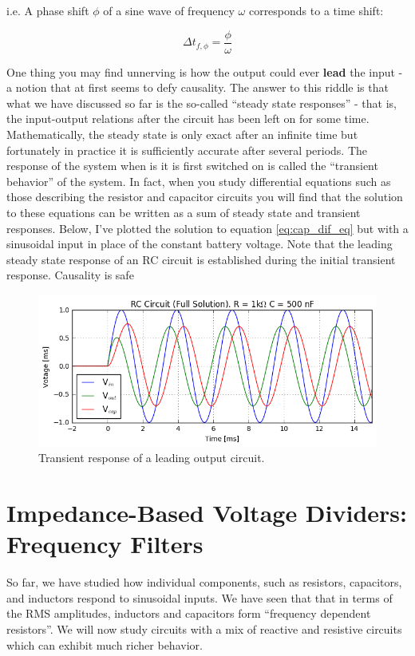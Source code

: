 \documentclass{tufte-book}
\begin{document}
\noindent i.e. A phase shift $\phi$ of a sine wave of frequency $\omega$ corresponds to a time shift:

\begin{equation}\label{eq:phase_time_sine_2}
\Delta t_{f,\phi} = \frac{\phi}{\omega}
\end{equation}

One thing you may find unnerving is how the output could ever \textbf{lead} the input - a notion that at first seems to defy causality. The answer to this riddle is that what we have discussed so far is the so-called ``steady state responses'' - that is, the input-output relations after the circuit has been left on for some time. Mathematically, the steady state is only exact after an infinite time but fortunately in practice it is sufficiently accurate after several periods. The response of the system when is it is first switched on is called the ``transient behavior'' of the system. In fact, when you study differential equations such as those describing the resistor and capacitor circuits you will find that the solution to these equations can be written as a sum of steady state and transient responses. Below, I've plotted the solution to equation \ref{eq:cap_dif_eq} but with a sinusoidal input in place of the constant battery voltage. Note that the leading steady state response of an RC circuit is established during the initial transient response. Causality is safe


\begin{figure}[h]
\caption{Transient response of a leading output circuit.}
\label{fig:RC_transient}
\begin{center}
\includegraphics[width=\textwidth]{RC_transient.png}
\end{center}
\end{figure}


\section{Impedance-Based Voltage Dividers: Frequency Filters}
So far, we have studied how individual components, such as resistors, capacitors, and inductors respond to sinusoidal inputs. We have seen that that in terms of the RMS amplitudes, inductors and capacitors form ``frequency dependent resistors''. We will now study circuits with a mix of reactive and resistive circuits which can exhibit much richer behavior.
\end{document}
